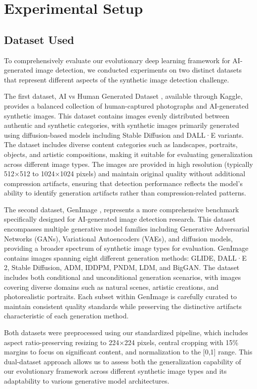 \documentclass[runningheads]{llncs}
\begin{document}
\section{Experimental Setup}

\subsection{Dataset Used}

To comprehensively evaluate our evolutionary deep learning framework for AI-generated image detection, we conducted experiments on two distinct datasets that represent different aspects of the synthetic image detection challenge.

The first dataset, AI vs Human Generated Dataset \cite{sala2023ai}, available through Kaggle, provides a balanced collection of human-captured photographs and AI-generated synthetic images. This dataset contains images evenly distributed between authentic and synthetic categories, with synthetic images primarily generated using diffusion-based models including Stable Diffusion and DALL·E variants. The dataset includes diverse content categories such as landscapes, portraits, objects, and artistic compositions, making it suitable for evaluating generalization across different image types. The images are provided in high resolution (typically 512×512 to 1024×1024 pixels) and maintain original quality without additional compression artifacts, ensuring that detection performance reflects the model's ability to identify generation artifacts rather than compression-related patterns.

The second dataset, GenImage \cite{zhu2023genimage}, represents a more comprehensive benchmark specifically designed for AI-generated image detection research. This dataset encompasses multiple generative model families including Generative Adversarial Networks (GANs), Variational Autoencoders (VAEs), and diffusion models, providing a broader spectrum of synthetic image types for evaluation. GenImage contains images spanning eight different generation methods: GLIDE, DALL·E 2, Stable Diffusion, ADM, IDDPM, PNDM, LDM, and BigGAN. The dataset includes both conditional and unconditional generation scenarios, with images covering diverse domains such as natural scenes, artistic creations, and photorealistic portraits. Each subset within GenImage is carefully curated to maintain consistent quality standards while preserving the distinctive artifacts characteristic of each generation method.

Both datasets were preprocessed using our standardized pipeline, which includes aspect ratio-preserving resizing to 224×224 pixels, central cropping with 15\% margins to focus on significant content, and normalization to the [0,1] range. This dual-dataset approach allows us to assess both the generalization capability of our evolutionary framework across different synthetic image types and its adaptability to various generative model architectures.
\end{document}
